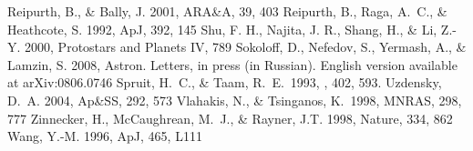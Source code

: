 \documentclass{emulateapj}
\begin{document}
\begin{thebibliography}{99}
 Reipurth, B., \& Bally, J. 2001, ARA\&A, 39, 403
 Reipurth, B., Raga, A.~C., \& Heathcote, S. 1992, ApJ, 392, 145
  Shu, F. H., Najita, J. R., Shang, H., \& Li, Z.-Y. 2000, Protostars and Planets IV, 789 
 Sokoloff, D., Nefedov, S., Yermash, A., \& Lamzin, S. 2008, Astron. Letters, in press (in Russian). English version available at arXiv:0806.0746
 Spruit, H.~C., \& Taam, R.~E.\ 1993, \apj, 402, 593.
 Uzdensky, D.~A. 2004, Ap\&SS, 292, 573
 Vlahakis, N., \& Tsinganos, K.\ 1998, MNRAS, 298, 777 
 Zinnecker, H., McCaughrean, M.~J., \& Rayner, J.T. 1998, Nature, 334, 862
 Wang, Y.-M. 1996, ApJ, 465, L111
\end{thebibliography}
\end{document}
